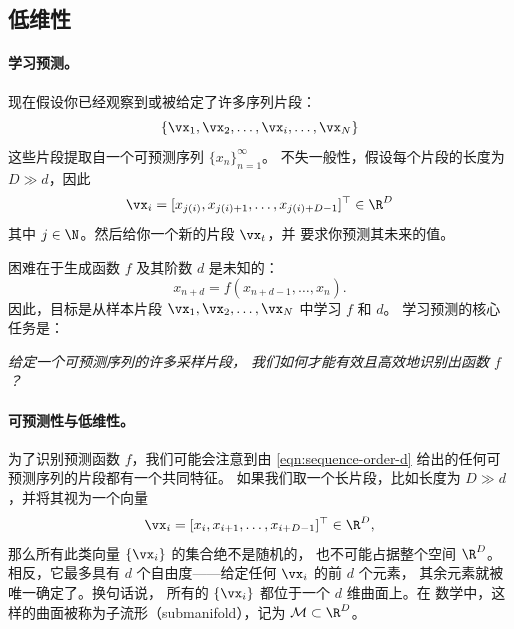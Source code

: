 \documentclass[../../book-main_zh.tex]{subfiles}
\begin{document}
\subsection{低维性}\label{sec:intro-low-dimensionality}
\paragraph{学习预测。}
现在假设你已经观察到或被给定了许多序列片段：
\begin{equation}
    \{\vx_{1}, \vx_{2}, \ldots, \vx_{i}, \ldots, \vx_{N}\}
\end{equation}
这些片段提取自一个可预测序列 \(\{x_{n}\}_{n=1}^{\infty}\)。
不失一般性，假设每个片段的长度为 \(D \gg d\)，因此
\begin{equation}
    \vx_{i} = [x_{j(i)}, x_{j(i)+1}, \ldots, x_{j(i)+D-1}]^{\top} \in \R^{D}
\end{equation}
其中 \(j \in \N\)。然后给你一个新的片段 \(\vx_{t}\)，并
要求你预测其未来的值。

困难在于生成函数 \(f\) 及其阶数 \(d\) 是未知的：
\begin{equation}
    x_{n+d} = f(x_{n+d-1}, \ldots, x_{n}).
    \label{eqn:sequence-order-d}
\end{equation}
因此，目标是从样本片段 \(\vx_{1}, \vx_{2}, \ldots, \vx_{N}\) 中学习 \(f\) 和 \(d\)。
学习预测的核心任务是：
\begin{center}
    \textit{给定一个可预测序列的许多采样片段，
    我们如何才能有效且高效地识别出函数 \(f\)？}
\end{center}

\paragraph{可预测性与低维性。}
为了识别预测函数 \(f\)，我们可能会注意到由 \eqref{eqn:sequence-order-d} 给出的任何可预测序列的片段都有一个共同特征。
如果我们取一个长片段，比如长度为 \(D \gg d\)，并将其视为一个向量
\begin{equation}
    \vx_{i} = [x_{i}, x_{i+1}, \ldots, x_{i+D-1}]^{\top} \in \R^{D},
    \label{eqn:segment-vector}
\end{equation}
那么所有此类向量 \(\{\vx_{i}\}\) 的集合绝不是随机的，
也不可能占据整个空间 \(\R^{D}\)。相反，它最多具有
\(d\) 个自由度——给定任何 \(\vx_{i}\) 的前 \(d\) 个元素，
其余元素就被唯一确定了。换句话说，
所有的 \(\{\vx_{i}\}\) 都位于一个 \(d\) 维曲面上。在
数学中，这样的曲面被称为子流形（submanifold），记为 \(\mathcal{M}
\subset \R^{D}\)。
\end{document}
